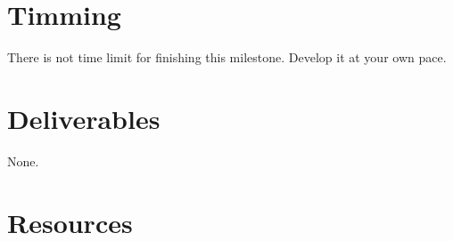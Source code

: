 \begin{enumerate}
\begin{enumerate}
  \end{enumerate}

\end{enumerate}

\section{Timming}

There is not time limit for finishing this milestone. Develop it at
your own pace.

\section{Deliverables}

None.

\section{Resources}



